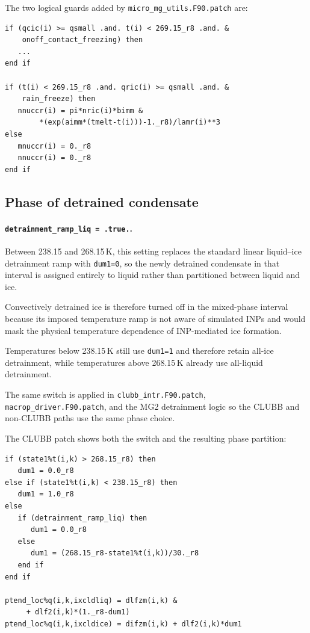 The two logical guards added by \texttt{micro\_mg\_utils.F90.patch} are:

\begin{verbatim}
if (qcic(i) >= qsmall .and. t(i) < 269.15_r8 .and. &
    onoff_contact_freezing) then
   ...
end if

if (t(i) < 269.15_r8 .and. qric(i) >= qsmall .and. &
    rain_freeze) then
   nnuccr(i) = pi*nric(i)*bimm &
        *(exp(aimm*(tmelt-t(i)))-1._r8)/lamr(i)**3
else
   mnuccr(i) = 0._r8
   nnuccr(i) = 0._r8
end if
\end{verbatim}

\subsection*{Phase of detrained condensate}

\paragraph*{\texttt{detrainment\_ramp\_liq = .true.}.}
Between 238.15 and 268.15\,K, this setting replaces the standard linear liquid--ice detrainment ramp with \texttt{dum1=0}, so the newly detrained condensate in that interval is assigned entirely to liquid rather than partitioned between liquid and ice.

Convectively detrained ice is therefore turned off in the mixed-phase interval because its imposed temperature ramp is not aware of simulated INPs and would mask the physical temperature dependence of INP-mediated ice formation.

Temperatures below 238.15\,K still use \texttt{dum1=1} and therefore retain all-ice detrainment, while temperatures above 268.15\,K already use all-liquid detrainment.

The same switch is applied in \texttt{clubb\_intr.F90.patch}, \texttt{macrop\_driver.F90.patch}, and the MG2 detrainment logic so the CLUBB and non-CLUBB paths use the same phase choice.

The CLUBB patch shows both the switch and the resulting phase partition:

\begin{verbatim}
if (state1%t(i,k) > 268.15_r8) then
   dum1 = 0.0_r8
else if (state1%t(i,k) < 238.15_r8) then
   dum1 = 1.0_r8
else
   if (detrainment_ramp_liq) then
      dum1 = 0.0_r8
   else
      dum1 = (268.15_r8-state1%t(i,k))/30._r8
   end if
end if

ptend_loc%q(i,k,ixcldliq) = dlfzm(i,k) &
     + dlf2(i,k)*(1._r8-dum1)
ptend_loc%q(i,k,ixcldice) = difzm(i,k) + dlf2(i,k)*dum1
\end{verbatim}

